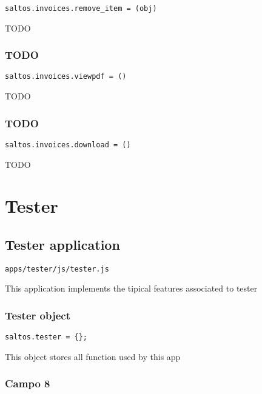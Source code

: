 \documentclass[a4paper]{article}
\begin{document}
\begin{lstlisting}
saltos.invoices.remove_item = (obj)
\end{lstlisting}

TODO

\hypertarget{toc146}{}
\subsubsection{TODO}

\begin{lstlisting}
saltos.invoices.viewpdf = ()
\end{lstlisting}

TODO

\hypertarget{toc147}{}
\subsubsection{TODO}

\begin{lstlisting}
saltos.invoices.download = ()
\end{lstlisting}

TODO


\hypertarget{toc148}{}
\section{Tester}

\hypertarget{toc149}{}
\subsection{Tester application}

\begin{lstlisting}
apps/tester/js/tester.js
\end{lstlisting}

This application implements the tipical features associated to tester

\hypertarget{toc150}{}
\subsubsection{Tester object}

\begin{lstlisting}
saltos.tester = {};
\end{lstlisting}

This object stores all function used by this app

\hypertarget{toc151}{}
\subsubsection{Campo 8}
\end{document}
